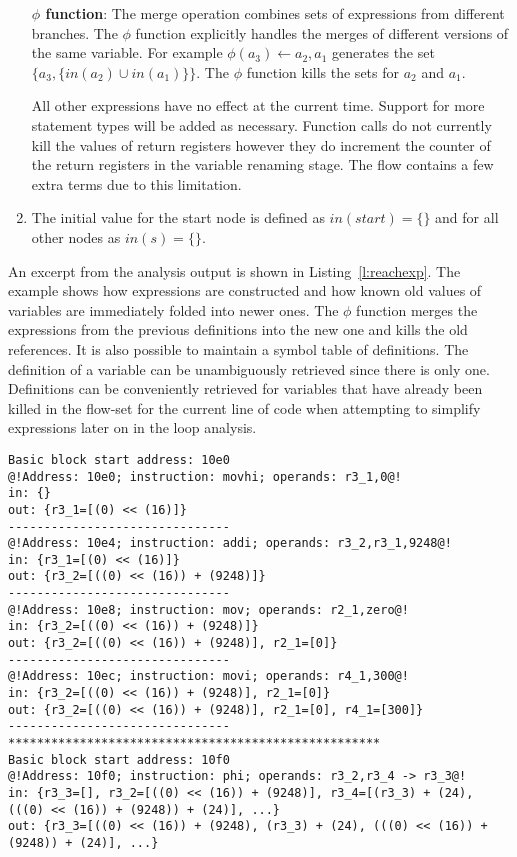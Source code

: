 \begin{enumerate}
  \textbf{$\phi$ function}: The merge operation combines sets of expressions from different branches. The $\phi$ function explicitly handles the merges of different versions of the same variable. For example $\phi(a_3) \leftarrow a_2,a_1$ generates the set $\{a_3, \{in(a_2) \cup in(a_1)\}\}$. The $\phi$ function kills the sets for $a_2$ and $a_1$.
  
  All other expressions have no effect at the current time. Support for more statement types will be added as necessary. Function calls do not currently kill the values of return registers however they do increment the counter of the return registers in the variable renaming stage. The flow contains a few extra terms due to this limitation.
  
  \item The initial value for the start node is defined as $in(start)=\{\}$ and for all other nodes as $in(s)=\{\}$. 
\end{enumerate}

	An excerpt from the analysis output is shown in Listing~\ref{l:reachexp}. 
	The example shows how expressions are constructed and how known old values of variables are immediately folded into newer ones. 
	The $\phi$ function merges the expressions from the previous definitions into the new one and kills the old references. 
	It is also possible to maintain a symbol table of definitions. 
	The definition of a variable can be unambiguously retrieved since there is only one. 
	Definitions can be conveniently retrieved for variables that have already been killed in the flow-set for the current line of code when attempting to simplify expressions later on in the loop analysis.

\begin{lstlisting}[caption={Example reaching expression analysis},label=l:reachexp,captionpos=t]
Basic block start address: 10e0
@!Address: 10e0; instruction: movhi; operands: r3_1,0@!
in: {}
out: {r3_1=[(0) << (16)]}
-------------------------------
@!Address: 10e4; instruction: addi; operands: r3_2,r3_1,9248@!
in: {r3_1=[(0) << (16)]}
out: {r3_2=[((0) << (16)) + (9248)]}
-------------------------------
@!Address: 10e8; instruction: mov; operands: r2_1,zero@!
in: {r3_2=[((0) << (16)) + (9248)]}
out: {r3_2=[((0) << (16)) + (9248)], r2_1=[0]}
-------------------------------
@!Address: 10ec; instruction: movi; operands: r4_1,300@!
in: {r3_2=[((0) << (16)) + (9248)], r2_1=[0]}
out: {r3_2=[((0) << (16)) + (9248)], r2_1=[0], r4_1=[300]}
-------------------------------
****************************************************
Basic block start address: 10f0
@!Address: 10f0; instruction: phi; operands: r3_2,r3_4 -> r3_3@!
in: {r3_3=[], r3_2=[((0) << (16)) + (9248)], r3_4=[(r3_3) + (24), (((0) << (16)) + (9248)) + (24)], ...}
out: {r3_3=[((0) << (16)) + (9248), (r3_3) + (24), (((0) << (16)) + (9248)) + (24)], ...}

\end{lstlisting} 

